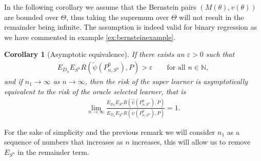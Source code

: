 \documentclass[11pt, a4paper]{article}
\newtheorem{corollary}[theorem]{Corollary}
\theoremstyle{definition}
\theoremstyle{remark}
\newcommand{\btheta}{\theta}
\newcommand{\la}{\psi}
\newcommand{\Sn}{S^n}
\begin{document}
In the following corollary we assume that the Bernstein pairs $ (M(\btheta), v(\btheta)) $ are bounded over $ \Theta $, thus taking the supremum over $ \Theta $ will not result in the remainder being infinite. The assumption is indeed valid for binary regression as we have commented in example \ref{ex:bernsteinexample}. 
\begin{corollary}[Asymptotic equivalence] \label{cor:dslasymptoticequivalence}
    If there exists an $ \varepsilon > 0 $ such that 
   \begin{align*}
       E_{D_n} E_{\Sn} R(\tilde{\la}(P_{n, \Sn}^{0}), P) > \varepsilon \qquad \text{for all } n \in \mathbb{N},
   \end{align*}
   and if $ n_1 \to \infty $ as $ n \to \infty $, then the risk of the super learner is asymptotically equivalent to the risk of the oracle selected learner, that is
   \begin{align*}
       \lim_{n \to \infty} \frac{E_{D_n} E_{\Sn} R(\hat{\la}(P_{n, \Sn}^{0}), P)}{E_{D_n} E_{\Sn} R(\tilde{\la}(P_{n, \Sn}^{0}), P)} = 1.
   \end{align*}
\end{corollary}
For the sake of simplicity and the previous remark we will consider $ n_1 $ as a sequence of numbers that increases as $ n $ increases, this will allow us to remove $ E_{\Sn} $ in the remainder term. 
\end{document}
